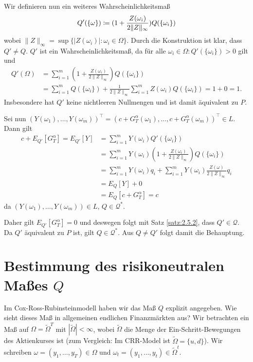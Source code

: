 \documentclass[a4paper,twoside,DIV15,BCOR12mm]{scrbook}
\newcommand{\cQ}{\mathcal Q}
\begin{document}
\begin{beweis}
Wir definieren nun ein weiteres Wahrscheinlichkeitsmaß 
\[
Q'(\{\omega\}) \da (1 + \frac{Z(\omega_i)}{2 \|Z\|_\infty}) Q(\{\omega_i\})
\]
wobei $\|Z\|_\infty = \sup \{|Z(\omega_i)|: \omega_i\in \Omega\}$. Durch die Konstruktion ist klar, dass $Q'\ne Q$. $Q'$ ist ein Wahrscheinlichkeitsmaß, da für alle $\omega_i\in \Omega: Q'(\{\omega_i\}) > 0$ gilt und
\begin{align*}
Q'(\Omega) &= \sum_{i=1}^m (1 + \frac{Z(\omega_i)}{2\|Z\|_\infty})Q(\{\omega_i\}) \\
&= \sum_{i=1}^m Q(\{\omega_i\}) + \frac{1}{2\|Z\|_\infty} \sum_{i=1}^m Z(\omega_i)Q(\{\omega_i\}) = 1 + 0 = 1.
\end{align*}
Insbesondere hat $Q'$ keine nichtleeren Nullmengen und ist damit äquivalent zu $P$.


Sei nun $(Y(\omega_1),\ldots,Y(\omega_m))^\top = (c + G_T^\alpha(\omega_1),\ldots,c + G_T^\alpha(\omega_m))^\top \in L$. Dann gilt
\begin{align*}
c + E_{Q'} [G_T^\alpha]  = E_{Q'}[Y]
&= \sum_{i=1}^m Y(\omega_i)Q'(\{\omega_i\})\\
&= \sum_{i=1}^m Y(\omega_i) (1 + \frac{Z(\omega_i)}{2\|Z\|_\infty})Q(\{\omega_i\}) \\
&= \sum_{i=1}^m Y(\omega_i)q_i + \sum_{i=1}^m Y(\omega_i) \frac{Z(\omega)}{2\|Z\|_\infty} q_i \\
&= E_Q[Y] + 0 \\
&= E_Q[c + G_T^\alpha] = c
\end{align*}
da $(Y(\omega_1),\ldots,Y(\omega_m))\in L$, $Q\in \cQ^*$.

Daher gilt $E_{Q'}[G_T^\alpha] = 0$ und deswegen folgt mit Satz \ref{satz:2.5.2}, dass $Q'\in \cQ$. Da $Q'$ äquivalent zu $P$ ist, gilt $Q\in \cQ^*$. Aus $Q\ne Q'$ folgt damit die Behauptung.
\end{beweis}

\section{Bestimmung des risikoneutralen Maßes $Q$}

Im Cox-Ross-Rubinsteinmodell haben wir das Maß $Q$ explizit angegeben. Wie sieht dieses Maß in allgemeinen endlichen Finanzmärkten aus? Wir betrachten ein Maß auf $\Omega = \tilde\Omega^T$ mit $|\tilde\Omega|<\infty$, wobei $\tilde\Omega$ die Menge der Ein-Schritt-Bewegungen des Aktienkurses ist (zum Vergleich: Im CRR-Model ist $\tilde\Omega=\{u,d\}$). Wir schreiben $\omega=(y_1,\ldots,y_T)\in \Omega$ und $\omega_t = (y_1,\ldots,y_t)\in \tilde\Omega^t$.
\end{document}
